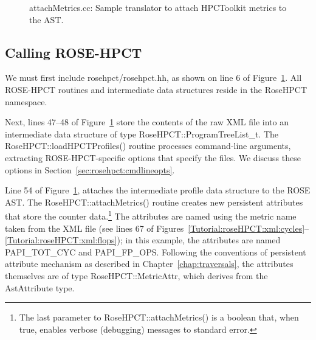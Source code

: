 \begin{figure}[!h]
{\indent
{\mySmallFontSize


\begin{latexonly}
   
\end{latexonly}

\begin{htmlonly}
   
\end{htmlonly}

}
}
\caption{attachMetrics.cc: Sample translator to attach HPCToolkit metrics to the AST.}
\label{Tutorial:roseHPCT:attach}
\end{figure}

\subsection{Calling ROSE-HPCT}

We must first include rosehpct/rosehpct.hh, as shown on line 6 of
Figure~\ref{Tutorial:roseHPCT:attach}. All ROSE-HPCT routines and
intermediate data structures reside in the RoseHPCT namespace.

Next, lines 47--48 of Figure~\ref{Tutorial:roseHPCT:attach} store the
contents of the raw XML file into an intermediate data structure of
type RoseHPCT::ProgramTreeList\_t. The RoseHPCT::loadHPCTProfiles()
routine processes command-line arguments, extracting
ROSE-HPCT-specific options that specify the files. We discuss these
options in Section~\ref{sec:rosehpct:cmdlineopts}.

Line 54 of Figure~\ref{Tutorial:roseHPCT:attach}, attaches the
intermediate profile data structure to the ROSE AST. The
RoseHPCT::attachMetrics() routine creates new persistent attributes
that store the counter data.\footnote{The last parameter to
RoseHPCT::attachMetrics() is a boolean that, when true, enables
verbose (debugging) messages to standard error.}  The attributes are
named using the metric name taken from the XML file (see lines 67 of
Figures~\ref{Tutorial:roseHPCT:xml:cycles}--\ref{Tutorial:roseHPCT:xml:flops});
in this example, the attributes are named PAPI\_TOT\_CYC and
PAPI\_FP\_OPS. Following the conventions of persistent attribute
mechanism as described in Chapter~\ref{chap:traversals}, the
attributes themselves are of type RoseHPCT::MetricAttr, which derives
from the AstAttribute type.

